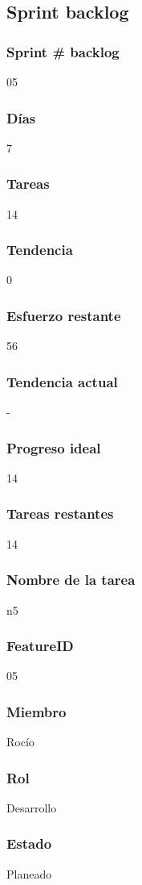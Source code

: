\subsection{Sprint backlog}
\subsubsection{Sprint # backlog}
05
\subsubsection{Días}
7
\subsubsection{Tareas}
14
\subsubsection{Tendencia}
0
\subsubsection{Esfuerzo restante}
56
\subsubsection{Tendencia actual}
-
\subsubsection{Progreso ideal}
14
\subsubsection{Tareas restantes}
14
\subsubsection{Nombre de la tarea}
n5
\subsubsection{FeatureID}
05
\subsubsection{Miembro}
Rocío
\subsubsection{Rol}
Desarrollo
\subsubsection{Estado}
Planeado
